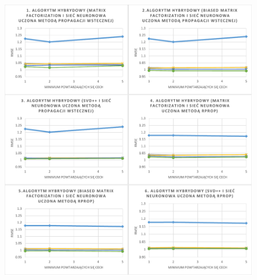 \documentclass[twoside]{iisthesis}
\begin{document}
\begin{figure}[!ht]
	\centering
	\includegraphics[page=1,width=1\textwidth]{exphybrid_amazon1}
	\label{fig:exphybrid_amazon1a}
\end{figure}
\end{document}
